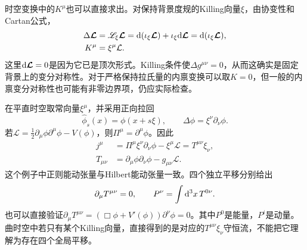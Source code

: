 时空变换中的$K^\mu$也可以直接求出。对保持背景度规的Killing向量$\xi$，由协变性和Cartan公式，
\begin{align}
    \Delta\boldsymbol{\mathcal L}
    &=\mathscr L_\xi\boldsymbol{\mathcal L}
    =\mathrm d(\iota_\xi\boldsymbol{\mathcal L})
    +\iota_\xi\mathrm d\boldsymbol{\mathcal L}
    =\mathrm d(\iota_\xi\boldsymbol{\mathcal L}),\\
    K^\mu&=\xi^\mu\mathcal L.
    \label{eq:noether-spacetime-k}
\end{align}
这里$\mathrm d\boldsymbol{\mathcal L}=0$是因为它已是顶次形式。Killing条件使$\Delta g^{\mu\nu}=0$，从而这确实是固定背景上的变分对称性。对于严格保持拉氏量的内禀变换可以取$K=0$，但一般的内禀变分对称性也可能有非零边界项，仍应实际检查。

\begin{example}[标量场的时空平移对称性]\label{ex:ct_scalar_translation}
    在平直时空取常向量$\xi^\mu$，并采用正向拉回
    \begin{equation}
        \widehat\phi_s(x)=\phi(x+s\xi),
        \qquad\Delta\phi=\xi^\nu\partial_\nu\phi.
    \end{equation}
    若$\mathcal L=\frac12\partial_\mu\phi\partial^\mu\phi-V(\phi)$，则$\Pi^\mu=\partial^\mu\phi$。因此
    \begin{align}
        j^\mu&=\Pi^\mu\xi^\nu\partial_\nu\phi-\xi^\mu\mathcal L
        =T^{\mu\nu}\xi_\nu,\\
        T_{\mu\nu}&=\partial_\mu\phi\partial_\nu\phi-g_{\mu\nu}\mathcal L.
    \end{align}
    这个例子中正则能动张量与Hilbert能动张量一致。四个独立平移分别给出
    \begin{equation}
        \partial_\mu T^{\mu\nu}=0,
        \qquad P^\nu=\int\mathrm d^3x\,T^{0\nu}.
    \end{equation}
    也可以直接验证$\partial_\mu T^{\mu\nu}=(\Box\phi+V'(\phi))\partial^\nu\phi=0$。其中$P^0$是能量，$P^i$是动量。曲时空中若只有某个Killing向量，直接得到的是对应的$T^{\mu\nu}\xi_\nu$守恒流，不能把它理解为存在四个全局平移。
\end{example}

